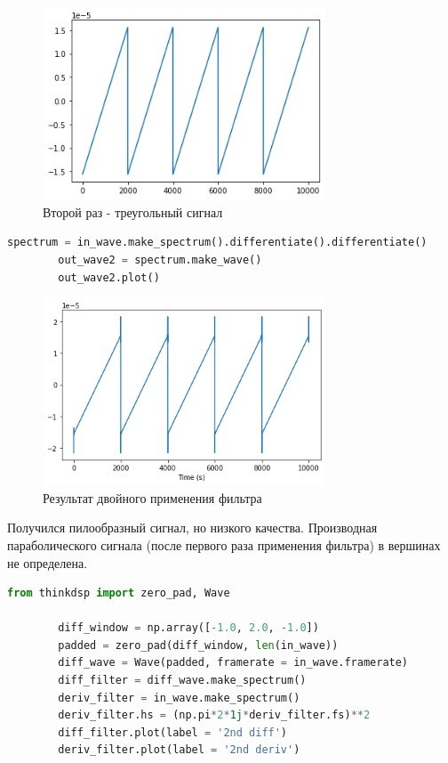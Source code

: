 \documentclass[a4paper, 12pt]{report}
\begin{document}
	\begin{figure}[H]
		\centering
		\includegraphics[width=0.75\textwidth]{task14.png}
		\caption{Второй раз - треугольный сигнал}
		\label{fig:task14}
	\end{figure}
	\begin{lstlisting}[language=Python,caption=Применение фильтра для дифференцирования]
		spectrum = in_wave.make_spectrum().differentiate().differentiate()
		out_wave2 = spectrum.make_wave()
		out_wave2.plot()
	\end{lstlisting}
	\begin{figure}[H]
		\centering
		\includegraphics[width=0.75\textwidth]{task15.png}
		\caption{Результат двойного применения фильтра}
		\label{fig:task15}
	\end{figure}
	Получился пилообразный сигнал, но низкого качества. Производная параболического сигнала (после первого раза применения фильтра) в вершинах не определена.
	\begin{lstlisting}[language=Python,caption=Сравнение результатов работы фильтров]
		from thinkdsp import zero_pad, Wave

		diff_window = np.array([-1.0, 2.0, -1.0])
		padded = zero_pad(diff_window, len(in_wave))
		diff_wave = Wave(padded, framerate = in_wave.framerate)
		diff_filter = diff_wave.make_spectrum()
		deriv_filter = in_wave.make_spectrum()
		deriv_filter.hs = (np.pi*2*1j*deriv_filter.fs)**2
		diff_filter.plot(label = '2nd diff')
		deriv_filter.plot(label = '2nd deriv')
	\end{lstlisting}
\end{document}
